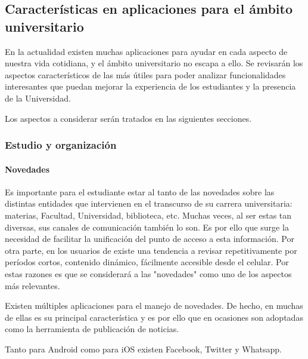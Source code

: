 \subsection{Características en aplicaciones para el ámbito universitario}
\label{aplicaciones_utiles_existentes}

En la actualidad existen muchas aplicaciones para ayudar en cada aspecto de
nuestra vida cotidiana, y el ámbito universitario no escapa a ello. Se
revisarán los aspectos característicos de las más útiles \cite{StudentApps} para poder analizar funcionalidades interesantes que puedan mejorar la experiencia de los estudiantes y la presencia de la Universidad.

Los aspectos a considerar serán tratados en las siguientes secciones.

\subsubsection{Estudio y organización}
\label{aplicaciones_utiles_existentes_estudio_organizacion}

\paragraph{Novedades}

Es importante para el estudiante estar al tanto de las novedades sobre las distintas entidades que intervienen en el transcurso de su carrera universitaria: materias, Facultad, Universidad, biblioteca, etc.
Muchas veces, al ser estas tan diversas, sus canales de comunicación también lo son.
Es por ello que surge la necesidad de facilitar la unificación del punto de acceso a esta información.
Por otra parte, en los usuarios de  existe una tendencia a revisar repetitivamente por períodos cortos, contenido dinámico, fácilmente accesible desde el celular\cite{oulasvirta2012habits}. Por estas razones es que se considerará a las "novedades" como uno de los aspectos más relevantes.

Existen múltiples aplicaciones para el manejo de novedades. De hecho, en muchas de ellas es su principal característica y es por ello que en ocasiones son adoptadas como la herramienta de publicación de noticias.

Tanto para Android como para iOS existen Facebook, Twitter y Whatsapp.


